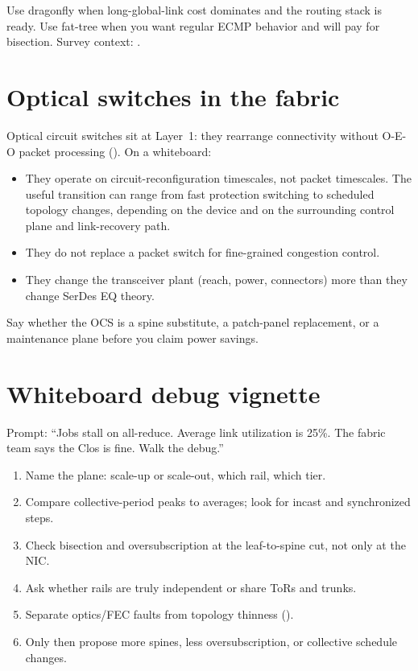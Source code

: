 Use dragonfly when long-global-link cost dominates and the routing stack is
ready. Use fat-tree when you want regular ECMP behavior and will pay for
bisection. Survey context: .

\section{Optical switches in the fabric}
\label{sec:hpc-ocs-place}

Optical circuit switches sit at Layer~1: they rearrange connectivity without
O-E-O packet processing (). On a whiteboard:

\begin{itemize}
\item They operate on circuit-reconfiguration timescales, not packet timescales.
      The useful transition can range from fast protection switching to
      scheduled topology changes, depending on the device and on the surrounding
      control plane and link-recovery path.
\item They do not replace a packet switch for fine-grained congestion control.
\item They change the transceiver plant (reach, power, connectors) more than
      they change SerDes EQ theory.
\end{itemize}

Say whether the OCS is a spine substitute, a patch-panel replacement, or a
maintenance plane before you claim power savings.

\section{Whiteboard debug vignette}
\label{sec:hpc-vignette}

Prompt: ``Jobs stall on all-reduce. Average link utilization is 25\%. The
fabric team says the Clos is fine. Walk the debug.''

\begin{enumerate}
\item Name the plane: scale-up or scale-out, which rail, which tier.
\item Compare collective-period peaks to averages; look for incast and
      synchronized steps.
\item Check bisection and oversubscription at the leaf-to-spine cut, not only
      at the NIC.
\item Ask whether rails are truly independent or share ToRs and trunks.
\item Separate optics/FEC faults from topology thinness
      ().
\item Only then propose more spines, less oversubscription, or collective
      schedule changes.
\end{enumerate}

